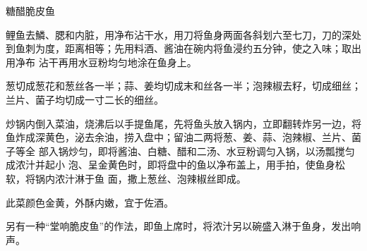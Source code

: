 \begin{recipe}{糖醋脆皮鱼}

\ingredients


\preparation

\step 鲤鱼去鱗、腮和内脏，用净布沾干水，用刀将鱼身两面各斜划六至七刀，刀的深处
到鱼刺为度，距离相等；先用料酒、酱油在碗内将鱼浸约五分钟，使之入味；取出用净布
沾干再用水豆粉均匀地涂在鱼身上。

\step 葱切成葱花和葱丝各一半；蒜、姜均切成末和丝各一半；泡辣椒去籽，切成细丝；
兰片、菌子均切成一寸二长的细丝。

\step 炒锅内倒入菜油，烧沸后以手提鱼尾，先将鱼头放入锅内，立即翻转炸另一边，将
鱼炸成深黄色，泌去余油，捞入盘中；留油二两将葱、姜、蒜、泡辣椒、兰片、菌子等全
部入锅炒匀，即将酱油、白糖、醋和二汤、水豆粉调匀入锅，以汤瓢搅匀成浓汁并起小
泡、呈金黄色时，即将盘中的鱼以净布盖上，用手拍，使鱼身松软，将锅内浓汁淋于鱼
面，撒上葱丝、泡辣椒丝即成。

\features

此菜颜色金黄，外酥内嫩，宜于佐酒。

另有一种“堂响脆皮鱼”的作法，即鱼上席时，将浓汁另以碗盛入淋于鱼身，发出响声。

\end{recipe}

